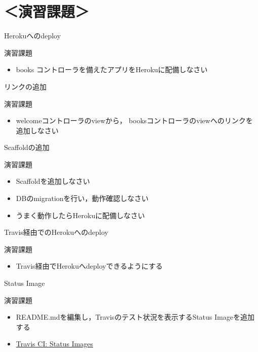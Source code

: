 \documentclass[t, aspectratio=169]{beamer}
\begin{document}
\section{＜演習課題＞}
\label{sec-7-4}
\begin{frame}[label=sec-7-4-1]{Herokuへのdeploy}
\begin{block}{演習課題}
\begin{itemize}
\item books コントローラを備えたアプリをHerokuに配備しなさい
\end{itemize}
\end{block}
\end{frame}

\begin{frame}[label=sec-7-4-2]{リンクの追加}
\begin{block}{演習課題}
\begin{itemize}
\item welcomeコントローラのviewから，
booksコントローラのviewへのリンクを追加しなさい
\end{itemize}
\end{block}
\end{frame}

\begin{frame}[label=sec-7-4-3]{Scaffoldの追加}
\begin{block}{演習課題}
\begin{itemize}
\item Scaffoldを追加しなさい
\item DBのmigrationを行い，動作確認しなさい
\item うまく動作したらHerokuに配備しなさい
\end{itemize}
\end{block}
\end{frame}

\begin{frame}[label=sec-7-4-4]{Travis経由でのHerokuへのdeploy}
\begin{block}{演習課題}
\begin{itemize}
\item Travis経由でHerokuへdeployできるようにする
\end{itemize}
\end{block}
\end{frame}

\begin{frame}[label=sec-7-4-5]{Status Image}
\begin{block}{演習課題}
\begin{itemize}
\item README.mdを編集し，Travisのテスト状況を表示するStatus Imageを追加する
\item \href{http://docs.travis-ci.com/user/status-images/}{Travis CI: Status Images}
\end{itemize}
\end{block}
\end{frame}
\end{document}
